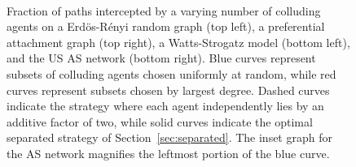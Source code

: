 \documentclass[prodmode,acmec]{ec-acmsmall}
\begin{document}
\begin{figure}[htbp]
\centering
{}
\quad
{}
\\
\quad
{}
\caption{Fraction of paths intercepted by a varying number of colluding agents
on a Erd\"os-R\'enyi random graph (top left), a preferential attachment graph
(top right), a Watts-Strogatz model (bottom left), and the US AS network
(bottom right). Blue curves represent subsets of colluding agents chosen
uniformly at random, while red curves represent subsets chosen by largest
degree. Dashed curves indicate the strategy where each agent independently lies
by an additive factor of two, while solid curves indicate the optimal separated
strategy of Section~\ref{sec:separated}. The inset graph for the AS network
magnifies the leftmost portion of the blue curve.}

\label{fig:erdos-renyi}
\end{figure}
\end{document}
